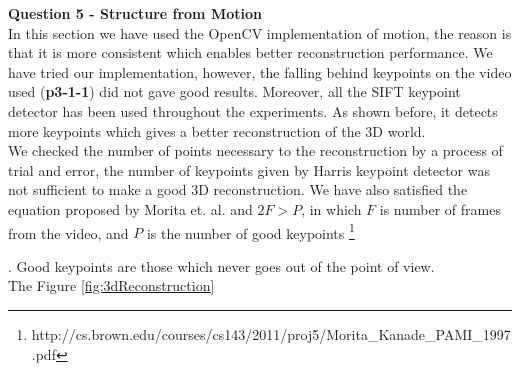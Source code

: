 \documentclass[12pt,a4paper]{article}
\newcommand\blfootnote[1]{%
	\begingroup
	\renewcommand\thefootnote{}\footnote{#1}%
	\addtocounter{footnote}{-1}%
	\endgroup
}
\begin{document}

\newpage

\textbf{\LARGE Question 5 - Structure from Motion} \\

In this section we have used the OpenCV implementation of motion, the reason is that it is more consistent which enables better reconstruction performance. We have tried our implementation, however, the falling behind keypoints on the video used (\textbf{p3-1-1}) did not gave good results. Moreover, all the SIFT keypoint detector has been used throughout the experiments. As shown before, it detects more keypoints which gives a better reconstruction of the 3D world. \\

We checked the number of points necessary to the reconstruction by a process of trial and error, the number of keypoints given by Harris keypoint detector was not sufficient to make a good 3D reconstruction. We have also satisfied the equation proposed by Morita et. al. and  $2F > P$, in which $F$ is number of frames from the video, and $P$ is the number of good keypoints \blfootnote{http://cs.brown.edu/courses/cs143/2011/proj5/Morita\_Kanade\_PAMI\_1997.pdf}. Good keypoints are those which never goes out of the point of view. \\

The Figure \ref{fig:3dReconstruction}
\end{document}
